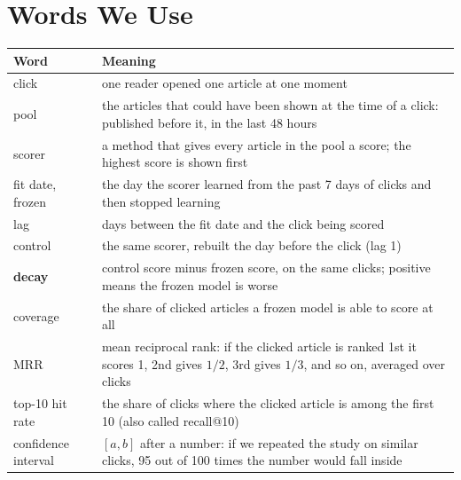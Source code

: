 \documentclass[11pt,a4paper]{article}
\begin{document}
\section{Words We Use}
\begin{center}
\small
\begin{tabularx}{\linewidth}{@{}lX@{}}
\toprule
\textbf{Word} & \textbf{Meaning}\\
\midrule
click & one reader opened one article at one moment\\
pool & the articles that could have been shown at the time of a click: published before it, in the last 48 hours\\
scorer & a method that gives every article in the pool a score; the highest score is shown first\\
fit date, frozen & the day the scorer learned from the past 7 days of clicks and then stopped learning\\
lag & days between the fit date and the click being scored\\
control & the same scorer, rebuilt the day before the click (lag 1)\\
\textbf{decay} & control score minus frozen score, on the same clicks; positive means the frozen model is worse\\
coverage & the share of clicked articles a frozen model is able to score at all\\
MRR & mean reciprocal rank: if the clicked article is ranked 1st it scores 1, 2nd gives $1/2$, 3rd gives $1/3$, and so on, averaged over clicks\\
top-10 hit rate & the share of clicks where the clicked article is among the first 10 (also called recall@10)\\
confidence interval & $[a,b]$ after a number: if we repeated the study on similar clicks, 95 out of 100 times the number would fall inside\\
\bottomrule
\end{tabularx}
\end{center}

\end{document}
